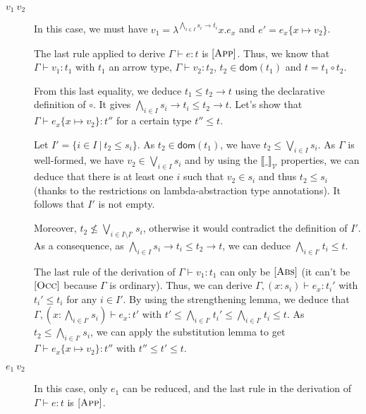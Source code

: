 \documentclass[a4paper]{article}%
\newcommand{\apply}[2]{#1\circ#2}
\newcommand{\dom}[1]{\textsf{dom}(#1)}
\newcommand{\alt}{~|~}
\newcommand{\subst}[2]{\{#1 \mapsto #2\}}
\newcommand{\arrow}[2]{#1\to #2}
\newcommand{\values}[0]{\mathcal{V}}
\newcommand{\valsemantic}[1]{{\llbracket #1 \rrbracket}_{\values}}
\theoremstyle{definition}
\newcommand {\Rule}[1] {[\textsc{#1}]}
\begin{document}
        \begin{description}
          \item[$v_1\ v_2$] In this case, we must have $v_1=\lambda^{\bigwedge_{i\in I} \arrow {s_i} {t_i}}x.e_x$ and $e'=e_x\subst x {v_2}$.
    
          The last rule applied to derive $\Gamma \vdash e:t$ is $\Rule{App}$.
          Thus, we know that $\Gamma \vdash v_1 : t_1$ with $t_1$ an arrow type, $\Gamma \vdash v_2 : t_2$, $t_2 \in \dom {t_1}$ and $t=\apply {t_1} {t_2}$.
    
          From this last equality, we deduce $t_1 \leq \arrow {t_2} t$ using the declarative definition of $\circ$.
          It gives $\bigwedge_{i\in I} \arrow {s_i} {t_i} \leq \arrow {t_2} t$.
          Let's show that $\Gamma \vdash e_x\subst x {v_2}:t''$ for a certain type $t''\leq t$.
    
          Let $I'=\{i\in I\alt t_2 \leq s_i\}$. As $t_2 \in \dom {t_1}$, we have $t_2 \leq \bigvee_{i\in I} s_i$.
          As $\Gamma$ is well-formed, we have $v_2 \in \bigvee_{i\in I} s_i$ and by using the $\valsemantic \_$ properties,
          we can deduce that there is at least one $i$ such that $v_2 \in s_i$ and thus $t_2 \leq s_i$ (thanks to the restrictions on lambda-abstraction type annotations).
          It follows that $I'$ is not empty.
    
          Moreover, $t_2 \not\leq \bigvee_{i\in I\setminus I'} s_i$, otherwise it would contradict the definition of $I'$.
          As a consequence, as $\bigwedge_{i\in I} \arrow {s_i} {t_i} \leq \arrow {t_2} t$,
          we can deduce $\bigwedge_{i \in I'}t_i \leq t$.
    
          The last rule of the derivation of $\Gamma \vdash v_1 : t_1$ can only be $\Rule{Abs}$ (it can't be $\Rule{Occ}$ because $\Gamma$ is ordinary).
          Thus, we can derive $\Gamma,(x:s_i) \vdash e_x : t_i'$ with $t_i' \leq t_i$ for any $i\in I'$. By using the strengthening lemma, we deduce that
          $\Gamma, (x:\bigwedge_{i\in I'} s_i) \vdash e_x:t'$ with $t'\leq \bigwedge_{i\in I'} t_i' \leq \bigwedge_{i\in I'} t_i \leq t$.
          As $t_2 \leq \bigwedge_{i\in I'} s_i$, we can apply the substitution lemma to get $\Gamma \vdash e_x\subst x {v_2}:t''$ with $t'' \leq t' \leq t$.
    
          \item[$e_1\ v_2$] In this case, only $e_1$ can be reduced, and the last rule in the derivation of $\Gamma \vdash e:t$ is $\Rule{App}$.
    

\end{description}
\end{document}
